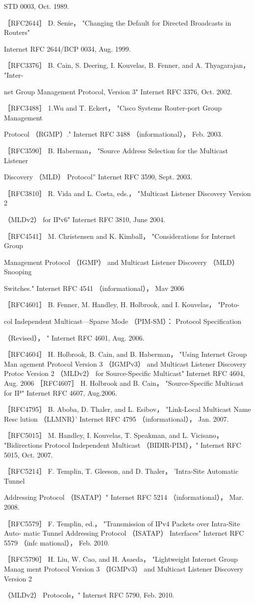 STD 0003, Oct. 1989.

［RFC2644］ D. Senie， "Changing the Default for Directed Broadcasts in Routers"

Internet RFC 2644/BCP 0034, Aug. 1999.

［RFC3376］ B. Cain, S. Deering, I. Kouvelas, B. Fenner, and A. Thyagarajan， "Inter-

net Group Management Protocol, Version 3" Internet RFC 3376, Oct. 2002.

［RFC3488］ 1.Wu and T. Eckert， "Cisco Systems Router-port Group Management

Protocol （RGMP）." Internet RFC 3488 （informational）， Feb. 2003.

［RFC3590］ B. Haberman， "Source Address Selection for the Multicast Listener

Discovery （MLD） Protocol” Internet RFC 3590, Sept. 2003.

［RFC3810］ R. Vida and L. Costa, eds.， "Multicast Listener Discovery Version 2

（MLDv2） for IPv6" Internet RFC 3810, June 2004.

［RFC4541］ M. Christensen and K. Kimball， "Considerations for Internet Group

Management Protocol （IGMP） and Multicast Listener Discovery （MLD） Snooping

Switches." Internet RFC 4541 （informational）， Mav 2006

［RFC4601］ B. Fenner, M. Handley, H. Holbrook, and I. Kouvelas， "Proto-

col Independent Multicast—Sparse Mode （PIM-SM）： Protocol Specification

（Revised）， " Internet RFC 4601, Aug. 2006.

［RFC4604］ H. Holbrook, B. Cain, and B. Haberman， "Using Internet Group Man
agement Protocol Version 3 （IGMPv3） and Multicast Listener Discovery Protoc
Version 2 （MLDv2） for Source-Specific Multicast" Internet RFC 4604, Aug. 2006
［RFC4607］ H. Holbrook and B. Cain， "Source-Specific Multicast for IP" Internet
RFC 4607, Aug.2006.

［RFC4795］ B. Aboba, D. Thaler, and L. Esibov， "Link-Local Multicast Name Resc
lution （LLMNR）' Internet RFC 4795 （informational）， Jan. 2007.

［RFC5015］ M. Handley, I. Kouvelas, T. Speakman, and L. Vicisano， "Bidirections
Protocol Independent Multicast （BIDIR-PIM），" Internet RFC 5015, Oct. 2007.

［RFC5214］ F. Templin, T. Gleeson, and D. Thaler， 'Intra-Site Automatic Tunnel

Addressing Protocol （ISATAP）" Internet RFC 5214 （informational）， Mar. 2008.

［RFC5579］ F. Templin, ed.， "Transmission of IPv4 Packets over Intra-Site Auto-
matic Tunnel Addressing Protocol （ISATAP） Interfaces" Internet RFC 5579 （infc
mational）， Feb. 2010.

［RFC5790］ H. Liu, W. Cao, and H. Asaeda， "Lightweight Internet Group Manag
ment Protocol Version 3 （IGMPv3） and Multicast Listener Discovery Version 2

（MLDv2） Protocols，" Internet RFC 5790, Feb. 2010.


